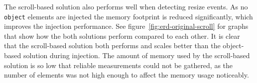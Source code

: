 \documentclass[a4paper,11pt]{kth-mag}
\newcommand{\code}[1]{\texttt{#1}}
\begin{document}

        The scroll-based solution also performs well when detecting resize events.
        As no \code{object} elements are injected the memory footprint is reduced significantly, which improves the injection performance.
        See figure~\ref{fig:erd-original-scroll} for graphs that show how the both solutions perform compared to each other.
        It is clear that the scroll-based solution both performs and scales better than the object-based solution during injection.        
        The amount of memory used by the scroll-based solution is so low that reliable measurements could not be gathered, as the number of elements was not high enough to affect the memory usage noticeably.
\end{document}
